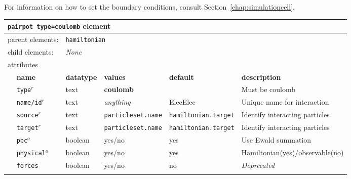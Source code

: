 For information on how to set the boundary conditions, consult Section~\ref{chap:simulationcell}.


\FloatBarrier
\begin{table}[h]
\begin{center}
\begin{tabularx}{\textwidth}{l l l l l X }
\hline
\multicolumn{6}{l}{\texttt{pairpot type=coulomb} element} \\
\hline
\multicolumn{2}{l}{parent elements:} & \multicolumn{4}{l}{\texttt{hamiltonian}}\\
\multicolumn{2}{l}{child  elements:} & \multicolumn{4}{l}{\textit{None}}\\
\multicolumn{2}{l}{attributes}  & \multicolumn{4}{l}{}\\
   &   \bfseries name     & \bfseries datatype & \bfseries values & \bfseries default   & \bfseries description \\
   & \texttt{type}$^r$    &  text              & \textbf{coulomb} &                     & Must be coulomb     \\
   & \texttt{name/id}$^r$ &  text              & \textit{anything}&  ElecElec           & Unique name for interaction\\
   & \texttt{source}$^r$  &  text              & \texttt{particleset.name} &\texttt{hamiltonian.target}& Identify interacting particles\\
   & \texttt{target}$^r$  &  text              & \texttt{particleset.name} &\texttt{hamiltonian.target}& Identify interacting particles\\
   & \texttt{pbc}$^o$     &  boolean           & yes/no           & yes                 & Use Ewald summation  \\
   & \texttt{physical}$^o$&  boolean           & yes/no           & yes                 & Hamiltonian(yes)/observable(no) \\
\dev{& \texttt{forces}      &  boolean           & yes/no           & no                  & \textit{Deprecated}             \\ }
  \hline
\end{tabularx}
\end{center}
\end{table}
\FloatBarrier

